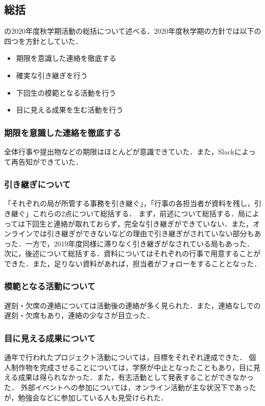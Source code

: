 \subsection*{\secondGrade{}総括}


\secondGrade{}の2020年度秋学期活動の総括について述べる．2020年度秋学期の方針では以下の四つを方針としていた．
\begin{itemize}
    \item 期限を意識した連絡を徹底する
    \item 確実な引き継ぎを行う
    \item 下回生の模範となる活動を行う
    \item 目に見える成果を生む活動を行う
\end{itemize}

\subsubsection*{期限を意識した連絡を徹底する}
全体行事や提出物などの期限はほとんどが意識できていた．また，Slackによって再告知ができていた．

\subsubsection*{引き継ぎについて}
「それぞれの局が所管する事務を引き継ぐ」，「行事の各担当者が資料を残し，引き継ぐ」これらの2点について総括する．
まず，前述について総括する．局によっては下回生と連絡が取れておらず，完全な引き継ぎができていない．また，オンラインでは引き継ぎができないなどの理由で引き継ぎがされていない部分もあった．一方で，2019年度同様に滞りなく引き継ぎがなされている局もあった．
次に，後述について総括する．資料についてはそれぞれの行事で用意することができた．また，足りない資料があれば，担当者がフォローをすることとなった．

\subsubsection*{模範となる活動について}
遅刻・欠席の連絡については活動後の連絡が多く見られた．また，連絡なしでの遅刻・欠席もあり，連絡の少なさが目立った．

\subsubsection*{目に見える成果について}
通年で行われたプロジェクト活動については，目標をそれぞれ達成できた．
個人制作物を完成させることについては，学祭が中止となったこともあり，目に見える成果は得られなかった．また，有志活動として発表することができなかった．
外部イベントへの参加については，オンライン活動が主な状況下であったが，勉強会などに参加している人も見受けられた．
